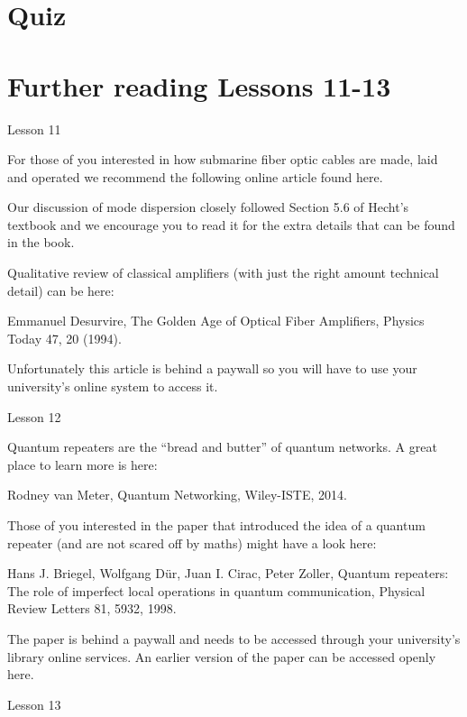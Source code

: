 \newpage
\section*{Quiz}


\section*{Further reading Lessons 11-13}

Lesson 11

For those of you interested in how submarine fiber optic cables are made, laid and operated we recommend the following online article found here.

Our discussion of mode dispersion closely followed Section 5.6 of Hecht’s textbook and we encourage you to read it for the extra details that can be found in the book.

Qualitative review of classical amplifiers (with just the right amount technical detail) can be here:

Emmanuel Desurvire, The Golden Age of Optical Fiber Amplifiers, Physics Today 47, 20 (1994).

Unfortunately this article is behind a paywall so you will have to use your university’s online system to access it.

Lesson 12

Quantum repeaters are the “bread and butter” of quantum networks. A great place to learn more is here:

Rodney van Meter, Quantum Networking, Wiley-ISTE, 2014.

Those of you interested in the paper that introduced the idea of a quantum repeater (and are not scared off by maths) might have a look here:

Hans J. Briegel, Wolfgang Dür, Juan I. Cirac, Peter Zoller, Quantum repeaters: The role of imperfect local operations in quantum communication, Physical Review Letters 81, 5932, 1998.

The paper is behind a paywall and needs to be accessed through your university’s library online services. An earlier version of the paper can be accessed openly here.

Lesson 13


